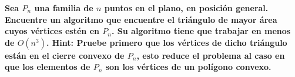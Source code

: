 \textbf{Sea $P_n$ una familia de $n$ puntos en el plano, en posición general. Encuentre un algoritmo que encuentre el triángulo de mayor área cuyos vértices estén en $P_n$. Su algoritmo tiene que trabajar en menos de $O(n^3)$. Hint: Pruebe primero que los vértices de dicho triángulo están en el cierre convexo de $P_n$, esto reduce el problema al caso en que los elementos de $P_n$ son los vértices de un polígono convexo.}\vspace{.2cm}

\textcolor{bibi}{}
\begin{quote}
\end{quote}